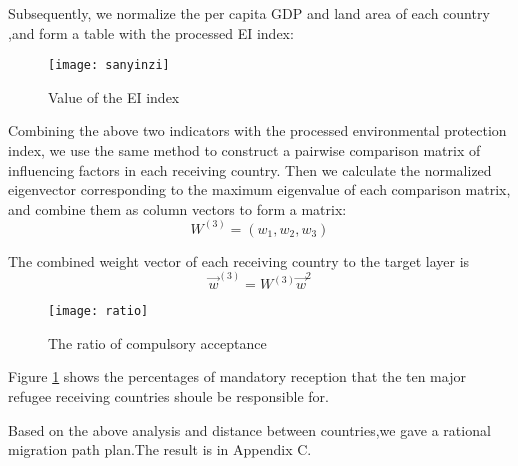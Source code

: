\documentclass{mcmthesis}
\begin{document}
Subsequently, we normalize the per capita GDP and land area of each country ,and form a table with the processed EI index:

\begin{figure}[h]%
	\small
	\centering
	\texttt{[image: sanyinzi]}%
	\caption{Value of the EI index}
\end{figure}

Combining the above two indicators with the processed environmental protection index, we use the same method to construct a pairwise comparison matrix of influencing factors in each receiving country. Then we calculate the normalized eigenvector corresponding to the maximum eigenvalue of each comparison matrix, and combine them as column vectors to form a matrix:
\begin{equation}
	W^{(3)}=(w_{1},w_{2},w_{3})
\end{equation}

The combined weight vector of each receiving country to the target layer is
\begin{equation}
\overrightarrow{w}^{(3)}=W^{(3)}\overrightarrow{w}^{2}
\end{equation}


\begin{figure}[h]%
	\small
	\centering
	\texttt{[image: ratio]}%
	\caption{The ratio of compulsory acceptance} \label{fig:ratio}%
\end{figure}

Figure \ref{fig:ratio} shows the percentages of mandatory reception that the ten major refugee receiving countries shoule be responsible for.


Based on the above analysis and distance between countries,we gave a rational migration path plan.The result is in Appendix C.
\end{document}

